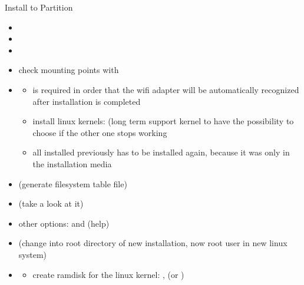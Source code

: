\begin{frame}{Install to Partition\vspace{0.5cm}}
  \begin{itemize}
    \item {}
    \item {}
    \item {}
    \item check mounting points with 
    \item {}
      \begin{Sidenote}
        \begin{itemize}
          \scriptsize
          \item {} is required in order that the  wifi adapter will be automatically recognized after installation is completed
          \item install linux kernels:  (long term support kernel to have the possibility to choose if the other one stops working
          \item all installed previously has to be installed again, because it was only in the installation media
        \end{itemize}
      \end{Sidenote}
    \item {} (generate filesystem table file)
    \item {} (take a look at it)
      \item other options:  and  (help)
      \item {} (change into root directory of new installation, now root user in new linux system)
      \item {}
    \begin{Sidenote}
      \begin{itemize}
        \scriptsize
        \item create ramdisk for the linux kernel: ,  (or )
      \end{itemize}
    \end{Sidenote}
  \end{itemize}
\end{frame}

